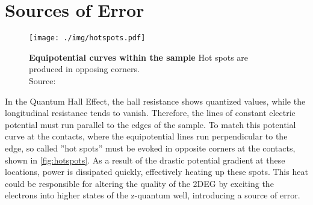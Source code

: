 \section{Sources of Error} %
\begin{figure}
	\centering
	\texttt{[image: ./img/hotspots.pdf]}
	\caption[Equipotential curves within the sample]{\textbf{Equipotential curves within the sample} Hot spots are produced in opposing corners.\\Source: \cite{hotspots}}
	\label{fig:hotspots}
\end{figure}
In the Quantum Hall Effect, the hall resistance shows quantized values, while the longitudinal resistance tends to vanish.
Therefore, the lines of constant electric potential must run parallel to the edges of the sample.
To match this potential curve at the contacts, where the equipotential lines run perpendicular to the edge, so called ''hot spots'' must be evoked in opposite corners at the contacts, shown in \autoref{fig:hotspots}.
As a result of the drastic potential gradient at these locations, power is dissipated quickly, effectively heating up these spots.
This heat could be responsible for altering the quality of the 2DEG by exciting the electrons into higher states of the z-quantum well, introducing a source of error. %
